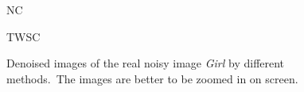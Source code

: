 \begin{figure}[t!]
{\begin{minipage}[t]{0.24\textwidth}
{\footnotesize NC}
\end{minipage}
\begin{minipage}[t]{0.24\textwidth}
\centering
{}
{\footnotesize TWSC}
\end{minipage}
}\vspace{-3mm}
    \caption{Denoised images of the real noisy image \textsl{Girl} \cite{ncwebsite} by different methods.\ The images are better to be zoomed in on screen.}
    \label{fig5-10}
\end{figure}


